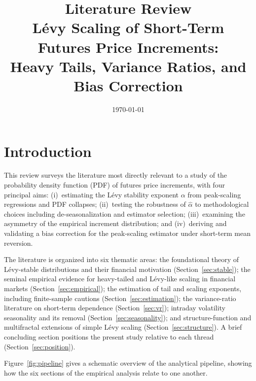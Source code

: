 \documentclass[12pt,a4paper]{article}
\title{\textbf{Literature Review}\\[0.4em]
       \large Lévy Scaling of Short-Term Futures Price Increments:\\
       Heavy Tails, Variance Ratios, and Bias Correction}
\date{\today}
\begin{document}
\maketitle
\tableofcontents
\newpage

\section{Introduction}

This review surveys the literature most directly relevant to a study of the
probability density function (PDF) of futures price increments, with four
principal aims: (i)~estimating the Lévy stability exponent $\alpha$ from
peak-scaling regressions and PDF collapses; (ii)~testing the robustness of
$\hat\alpha$ to methodological choices including de-seasonalization and
estimator selection; (iii)~examining the asymmetry of the empirical increment
distribution; and (iv)~deriving and validating a bias correction for the
peak-scaling estimator under short-term mean reversion.

The literature is organized into six thematic areas: the foundational theory
of Lévy-stable distributions and their financial motivation
(Section~\ref{sec:stable}); the seminal empirical evidence for heavy-tailed
and Lévy-like scaling in financial markets (Section~\ref{sec:empirical});
the estimation of tail and scaling exponents, including finite-sample cautions
(Section~\ref{sec:estimation}); the variance-ratio literature on short-term
dependence (Section~\ref{sec:vr}); intraday volatility seasonality and its
removal (Section~\ref{sec:seasonality}); and structure-function and
multifractal extensions of simple Lévy scaling (Section~\ref{sec:structure}).
A brief concluding section positions the present study relative to each thread
(Section~\ref{sec:position}).

Figure~\ref{fig:pipeline} gives a schematic overview of the analytical
pipeline, showing how the six sections of the empirical analysis relate to
one another.
\end{document}
